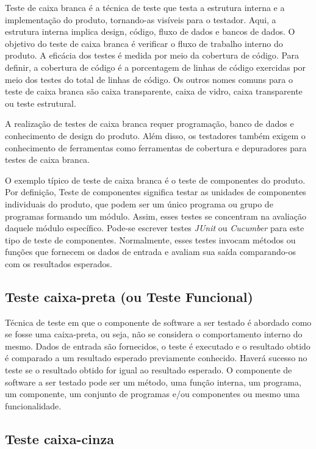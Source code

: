 Teste de caixa branca é a técnica de teste que testa a estrutura interna e a implementação do produto, tornando-as visíveis para o testador. Aqui, a estrutura interna implica design, código, fluxo de dados e bancos de dados. O objetivo do teste de caixa branca é verificar o fluxo de trabalho interno do produto. A eficácia dos testes é medida por meio da cobertura de código. Para definir, a cobertura de código é a porcentagem de linhas de código exercidas por meio dos testes do total de linhas de código. Os outros nomes comuns para o teste de caixa branca são caixa transparente, caixa de vidro, caixa transparente ou teste estrutural.

A realização de testes de caixa branca requer programação, banco de dados e conhecimento de design do produto. Além disso, os testadores também exigem o conhecimento de ferramentas como ferramentas de cobertura e depuradores para testes de caixa branca.

O exemplo típico de teste de caixa branca é o teste de componentes do produto. Por definição, Teste de componentes significa testar as unidades de componentes individuais do produto, que podem ser um único programa ou grupo de programas formando um módulo. Assim, esses testes se concentram na avaliação daquele módulo específico. Pode-se escrever testes \textit{JUnit} ou \textit{Cucumber} para este tipo de teste de componentes. Normalmente, esses testes invocam métodos ou funções que fornecem os dados de entrada e avaliam sua saída comparando-os com os resultados esperados.

\nocite{branca}
\nocite{testeufpr}

\subsection{Teste caixa-preta (ou Teste Funcional)}

Técnica de teste em que o componente de software a ser testado é abordado como se fosse uma caixa-preta, ou seja, não se considera o comportamento interno do mesmo.
Dados de entrada são fornecidos, o teste é executado e o resultado obtido é comparado a um resultado esperado previamente conhecido.
Haverá sucesso no teste se o resultado obtido for igual ao resultado esperado.
O componente de software a ser testado pode ser um método, uma função interna, um programa, um componente, um conjunto de programas e/ou componentes ou mesmo uma funcionalidade.

\nocite{canaltiteste}

\subsection{Teste caixa-cinza}

